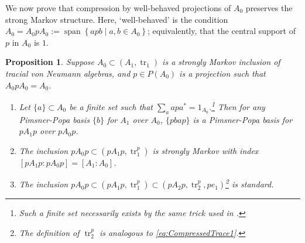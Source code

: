 \documentclass[11pt]{article}
\theoremstyle{plain}
\newtheorem{prop}[thm]{Proposition}
\theoremstyle{definition}
\DeclareMathOperator{\spann}{span}
\DeclareMathOperator{\tr}{tr}
\newcommand{\set}[2]{\left\{#1 \middle| #2\right\}}
\newcommand{\nn}[1]{\textcolor{red}{[[#1]]}}
\begin{document}
We now prove that compression by well-behaved projections of $A_0$ preserves the strong Markov structure.
Here, `well-behaved' is the condition 
$A_0 = A_0 p A_0 := \spann\set{apb}{a,b\in A_0}$; equivalently, that the central support of $p$ in $A_0$ is $1$.

\begin{prop}
\label{prop:CompressingStronglyMarkovInclusion}
Suppose $A_0 \subset (A_1, \tr_1)$ is a strongly Markov inclusion of tracial von Neumann algebras, and $p\in P(A_0)$ is a projection such that $A_0pA_0 = A_0$.
\begin{enumerate}[label={\rm(\arabic*)}]
\item
Let $\{a\}\subset A_0$ be a finite set such that $\sum_{a} apa^* = 1_{A_0}$.\footnote{
Such a finite set necessarily exists by the same trick used in \cite[Prop.~3(b)]{MR561983}.
}
Then for any Pimsner-Popa basis $\{b\}$ for $A_1$ over $A_0$, $\{pbap\}$ is a Pimsner-Popa basis for $pA_1p$ over $pA_0p$.
\item
The inclusion $pA_0p \subset (pA_1p, \tr_1^p)$ is strongly Markov with index $[pA_1p:pA_0p] = [A_1:A_0]$.
\item
The inclusion $pA_0p \subset (pA_1p, \tr_1^p) \subset (pA_2p , \tr_2^p, pe_1)$\footnote{
The definition of $\tr^p_2$ is analogous to \eqref{eq:CompressedTrace1}.
} is standard.
\end{enumerate}
\end{prop}
\end{document}

